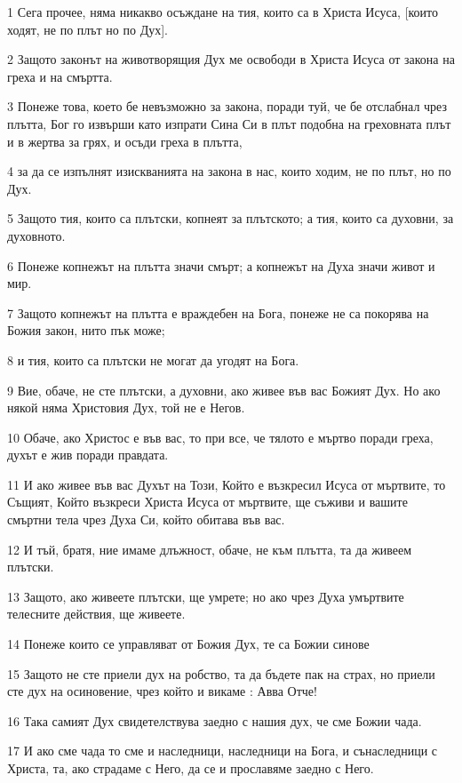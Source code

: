 \par 1 Сега прочее, няма никакво осъждане на тия, които са в Христа Исуса, [които ходят, не по плът но по Дух].
\par 2 Защото законът на животворящия Дух ме освободи в Христа Исуса от закона на греха и на смъртта.
\par 3 Понеже това, което бе невъзможно за закона, поради туй, че бе отслабнал чрез плътта, Бог го извърши като изпрати Сина Си в плът подобна на греховната плът и в жертва за грях, и осъди греха в плътта,
\par 4 за да се изпълнят изискванията на закона в нас, които ходим, не по плът, но по Дух.
\par 5 Защото тия, които са плътски, копнеят за плътското; а тия, които са духовни, за духовното.
\par 6 Понеже копнежът на плътта значи смърт; а копнежът на Духа значи живот и мир.
\par 7 Защото копнежът на плътта е враждебен на Бога, понеже не са покорява на Божия закон, нито пък може;
\par 8 и тия, които са плътски не могат да угодят на Бога.
\par 9 Вие, обаче, не сте плътски, а духовни, ако живее във вас Божият Дух. Но ако някой няма Христовия Дух, той не е Негов.
\par 10 Обаче, ако Христос е във вас, то при все, че тялото е мъртво поради греха, духът е жив поради правдата.
\par 11 И ако живее във вас Духът на Този, Който е възкресил Исуса от мъртвите, то Същият, Който възкреси Христа Исуса от мъртвите, ще съживи и вашите смъртни тела чрез Духа Си, който обитава във вас.
\par 12 И тъй, братя, ние имаме длъжност, обаче, не към плътта, та да живеем плътски.
\par 13 Защото, ако живеете плътски, ще умрете; но ако чрез Духа умъртвите телесните действия, ще живеете.
\par 14 Понеже които се управляват от Божия Дух, те са Божии синове
\par 15 Защото не сте приели дух на робство, та да бъдете пак на страх, но приели сте дух на осиновение, чрез който и викаме : Авва Отче!
\par 16 Така самият Дух свидетелствува заедно с нашия дух, че сме Божии чада.
\par 17 И ако сме чада то сме и наследници, наследници на Бога, и сънаследници с Христа, та, ако страдаме с Него, да се и прославяме заедно с Него.
